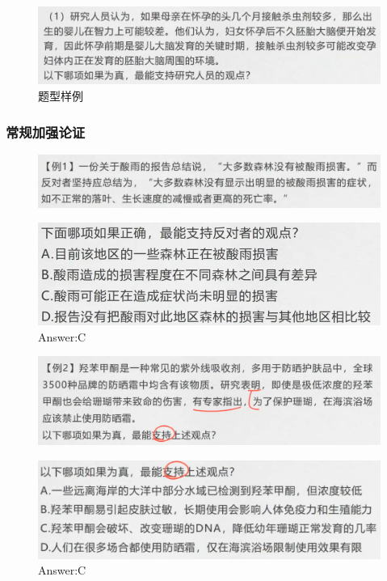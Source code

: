 \documentclass{article}
\numberwithin{equation}{section}						%
\numberwithin{figure}{section}							%
\begin{document}
\begin{sloppypar}
\begin{figure}[H]
     \centering
     \includegraphics[width=0.6\linewidth]{218.png}
	  \caption{题型样例}
\end{figure}

\subsubsection{常规加强论证}



\begin{figure}[H]
     \centering
     \includegraphics[width=0.6\linewidth]{219.png}
\end{figure}

\begin{figure}[H]
     \centering
     \includegraphics[width=0.5\linewidth]{220.png}
		\caption{Answer:C}
\end{figure}


\begin{figure}[H]
     \centering
     \includegraphics[width=0.6\linewidth]{221.png}
\end{figure}

\begin{figure}[H]
     \centering
     \includegraphics[width=0.55\linewidth]{222.png}
		\caption{Answer:C}
\end{figure}



\end{sloppypar}
\end{document}
